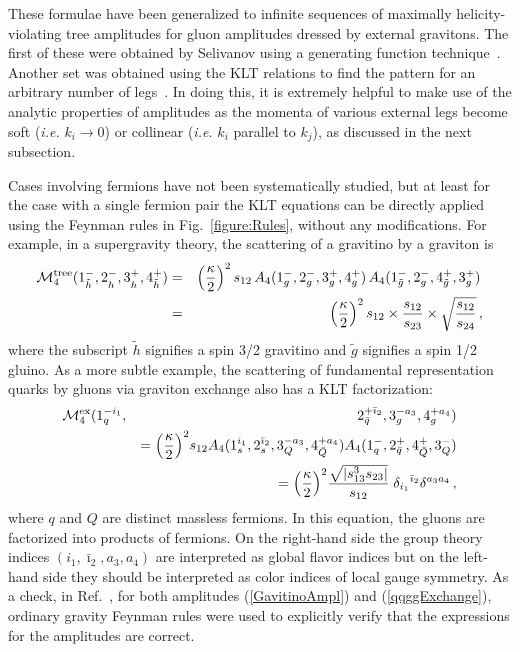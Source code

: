 \documentclass[12pt]{livrev}
\begin{document}
These formulae have been generalized to infinite sequences of
maximally helicity-violating tree amplitudes for gluon amplitudes
dressed by external gravitons.  The first of these were obtained by
Selivanov using a generating function technique~\cite{Selivanov}.
Another set was obtained using the KLT relations to find the pattern
for an arbitrary number of legs~\cite{Square}.  In doing this, it is
extremely helpful to make use of the analytic properties of amplitudes
as the momenta of various external legs become soft ({\it i.e.} $k_i
\rightarrow 0$) or collinear ({\it i.e.}  $k_i$ parallel to $k_j$), as discussed
in the next subsection.

Cases involving fermions have not been systematically studied, but at
least for the case with a single fermion pair the KLT equations
can be directly applied using the Feynman rules in
Fig.~\ref{figure:Rules}, without any modifications.  For example, in a
supergravity theory, the scattering of a gravitino by a graviton is
%
\begin{eqnarray}
{\cal M}_4^{\rm tree} (1^-_{\tilde h}, 2^-_{h {\vphantom{\tilde h}}}, 
                   3^+_{h {\vphantom{\tilde h}}}, 4^+_{\tilde h}) 
& = & \left({\kappa \over 2} \right)^{2}  
s_{12} \, A_4(1_g^-,2_g^-,3_g^+,4_g^+) \, 
A_4(1_{\tilde g}^-,2_g^-,4_{\tilde g}^+,3_g^+) \,  \nonumber \\
& = &
\left({\kappa \over 2} \right)^{2} 
s_{12} \times {s_{12}\over s_{23}}  \times \sqrt{s_{12} \over s_{24}}  \,,
\label{GavitinoAmpl}
\end{eqnarray}
%
where the subscript $\tilde h$ signifies a spin 3/2 gravitino and
$\tilde g$ signifies a spin 1/2 gluino.  As a more subtle example,
the scattering of fundamental representation quarks by gluons via
graviton exchange also has a KLT factorization:
%
\begin{eqnarray}
{\cal M}_4^{\rm ex}(1_q^{-i_1},&& 
 2_{\bar q}^{+{\bar\imath}_2}, 3_g^{-a_3}, 4_g^{+a_4}) 
\nonumber\\
&&  = 
\Bigl({\kappa \over 2}\Bigr)^2
  s_{12} A_4(1_s^{i_1}, 2_s^{{\bar\imath}_2}, 3_Q^{-a_3}, 4_{\bar Q}^{+a_4}) 
         A_4(1_q^-, 2_{\bar q}^+, 4_{\bar Q}^+, 3_Q^-) \nonumber \\
&& = 
\Bigl({\kappa \over 2}\Bigr)^2  {\sqrt{|s_{13}^3 s_{23}|} \over s_{12}} \;
 \delta_{i_1}{}^{{\bar\imath}_2}\delta^{a_3a_4} \,,
\label{qqggExchange}
\end{eqnarray}
%
where $q$ and $Q$ are distinct massless fermions. In this equation, the
gluons are factorized into products of fermions. On the
right-hand side the group theory indices $(i_1, \bar\imath_2, a_3,
a_4)$ are interpreted as global flavor indices but on the
left-hand side they should be interpreted as color indices of local
gauge symmetry.  As a check, in Ref.~\cite{Square}, for both
amplitudes (\ref{GavitinoAmpl}) and (\ref{qqggExchange}), ordinary
gravity Feynman rules were used to explicitly verify that the
expressions for the amplitudes are correct.
\end{document}
